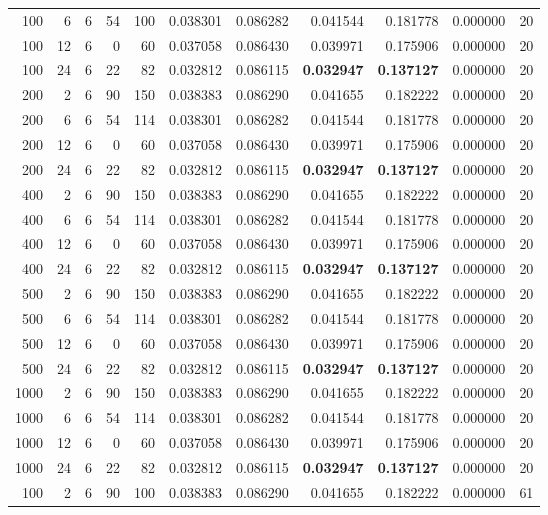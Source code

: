 \begin{table}
\begin{tabular}{rrrrrrrrrrr}
100 & 6 & 6 & 54 & 100 & 0.038301 & 0.086282 & 0.041544 & 0.181778 & 0.000000 & 20 \\
100 & 12 & 6 & 0 & 60 & 0.037058 & 0.086430 & 0.039971 & 0.175906 & 0.000000 & 20 \\
100 & 24 & 6 & 22 & 82 & 0.032812 & 0.086115 & \textbf{0.032947} & \textbf{0.137127} & 0.000000 & 20 \\
200 & 2 & 6 & 90 & 150 & 0.038383 & 0.086290 & 0.041655 & 0.182222 & 0.000000 & 20 \\
200 & 6 & 6 & 54 & 114 & 0.038301 & 0.086282 & 0.041544 & 0.181778 & 0.000000 & 20 \\
200 & 12 & 6 & 0 & 60 & 0.037058 & 0.086430 & 0.039971 & 0.175906 & 0.000000 & 20 \\
200 & 24 & 6 & 22 & 82 & 0.032812 & 0.086115 & \textbf{0.032947} & \textbf{0.137127} & 0.000000 & 20 \\
400 & 2 & 6 & 90 & 150 & 0.038383 & 0.086290 & 0.041655 & 0.182222 & 0.000000 & 20 \\
400 & 6 & 6 & 54 & 114 & 0.038301 & 0.086282 & 0.041544 & 0.181778 & 0.000000 & 20 \\
400 & 12 & 6 & 0 & 60 & 0.037058 & 0.086430 & 0.039971 & 0.175906 & 0.000000 & 20 \\
400 & 24 & 6 & 22 & 82 & 0.032812 & 0.086115 & \textbf{0.032947} & \textbf{0.137127} & 0.000000 & 20 \\
500 & 2 & 6 & 90 & 150 & 0.038383 & 0.086290 & 0.041655 & 0.182222 & 0.000000 & 20 \\
500 & 6 & 6 & 54 & 114 & 0.038301 & 0.086282 & 0.041544 & 0.181778 & 0.000000 & 20 \\
500 & 12 & 6 & 0 & 60 & 0.037058 & 0.086430 & 0.039971 & 0.175906 & 0.000000 & 20 \\
500 & 24 & 6 & 22 & 82 & 0.032812 & 0.086115 & \textbf{0.032947} & \textbf{0.137127} & 0.000000 & 20 \\
1000 & 2 & 6 & 90 & 150 & 0.038383 & 0.086290 & 0.041655 & 0.182222 & 0.000000 & 20 \\
1000 & 6 & 6 & 54 & 114 & 0.038301 & 0.086282 & 0.041544 & 0.181778 & 0.000000 & 20 \\
1000 & 12 & 6 & 0 & 60 & 0.037058 & 0.086430 & 0.039971 & 0.175906 & 0.000000 & 20 \\
1000 & 24 & 6 & 22 & 82 & 0.032812 & 0.086115 & \textbf{0.032947} & \textbf{0.137127} & 0.000000 & 20 \\
100 & 2 & 6 & 90 & 100 & 0.038383 & 0.086290 & 0.041655 & 0.182222 & 0.000000 & 61 \\

\end{tabular}
\end{table}
